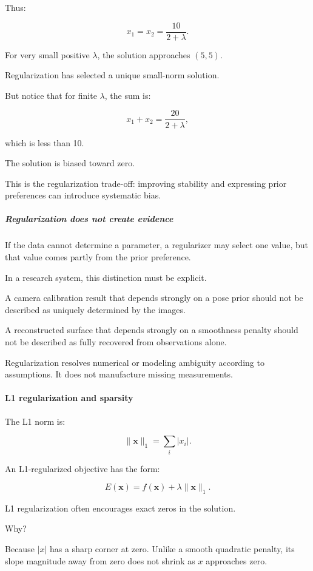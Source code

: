 Thus:

\[
\boxed{ x_1=x_2=\frac{10}{2+\lambda} }.
\]

For very small positive \(\lambda\), the solution approaches \((5,5)\).

Regularization has selected a unique small-norm solution.

But notice that for finite \(\lambda\), the sum is:

\[
x_1+x_2=\frac{20}{2+\lambda},
\]

which is less than 10.

The solution is biased toward zero.

This is the regularization trade-off: improving stability and expressing prior preferences can introduce systematic bias.

\subparagraph{Regularization does not create evidence}\label{regularization-does-not-create-evidence}

If the data cannot determine a parameter, a regularizer may select one value, but that value comes partly from the prior preference.

In a research system, this distinction must be explicit.

A camera calibration result that depends strongly on a pose prior should not be described as uniquely determined by the images.

A reconstructed surface that depends strongly on a smoothness penalty should not be described as fully recovered from observations alone.

Regularization resolves numerical or modeling ambiguity according to assumptions. It does not manufacture missing measurements.

\paragraph{L1 regularization and sparsity}\label{l1-regularization-and-sparsity}

The L1 norm is:

\[
\boxed{ \|\mathbf x\|_1=\sum_i|x_i| }.
\]

An L1-regularized objective has the form:

\[
\boxed{ E(\mathbf x)= f(\mathbf x)+\lambda\|\mathbf x\|_1 }.
\]

L1 regularization often encourages exact zeros in the solution.

Why?

Because \(|x|\) has a sharp corner at zero. Unlike a smooth quadratic penalty, its slope magnitude away from zero does not shrink as \(x\) approaches zero.

